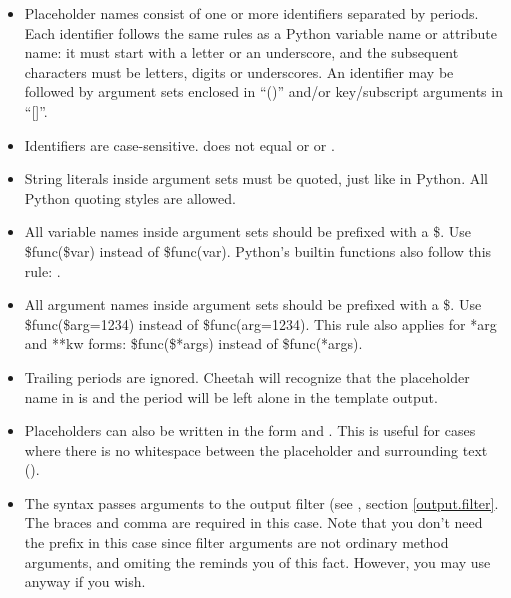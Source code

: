 \begin{itemize} 
     
\item Placeholder names consist of one or more identifiers separated by periods.
     Each identifier follows the same rules as a Python variable name or
     attribute name: it must start with a letter or an underscore, and the
     subsequent characters must be letters, digits or underscores.  An
     identifier may be followed by argument sets enclosed in ``()'' and/or
     key/subscript arguments in ``[]''.

\item Identifiers are case-sensitive.  does not equal 
     or  or .     
     
\item String literals inside argument sets must be quoted, just like in Python.
     All Python quoting styles are allowed.
     
\item All variable names inside argument sets should be prefixed with a \$.
     Use \$func(\$var) instead of \$func(var).  Python's builtin functions also
     follow this rule: .

\item All argument names inside argument sets should be prefixed with a \$.
     Use \$func(\$arg=1234) instead of \$func(arg=1234).  This rule also applies
     for *arg and **kw forms: \$func(\$*args) instead of \$func(*args).
    
\item Trailing periods are ignored.  Cheetah will recognize that the placeholder
     name in  is  and the period will be left
     alone in the template output.
     
\item Placeholders can also be written in the form 
     and .  This is useful for cases where there is no
     whitespace between the placeholder and surrounding text
     ().

\item The syntax  passes arguments to
     the output filter (see , section \ref{output.filter}.
     The braces and comma are required in this case.  Note that you don't need
     the \code{\$} prefix in this case since filter arguments are not ordinary
     method arguments, and omiting the \code{\$} reminds you of this fact.
     However, you may use \code{\$} anyway if you wish.


\end{itemize}
